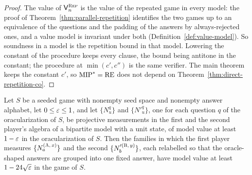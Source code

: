 \begin{proof}
\leanok
The value of $\mathsf{V}^{\textsc{Rep}}_n$ is the value of the repeated game in every model: the proof of
Theorem~\ref{thm:parallel-repetition} identifies the two games up to an equivalence of the
questions and the padding of the answers by always-rejected ones, and a value model is invariant
under both (Definition~\ref{def:value-model}). So soundness in a model is the repetition bound
in that model. Lowering the constant of the procedure keeps every clause, the bound being
antitone in the constant; the procedure at $\min(c', c'')$ is the same verifier. The main
theorem keeps the constant $c'$, so $\mathrm{MIP}^* = \mathrm{RE}$ does not depend on
Theorem~\ref{thm:direct-repetition-co}.
\end{proof}

\begin{lemma}
\label{lem:oracular-soundness-model}
\leanok
Let $S$ be a seeded game with nonempty seed space and nonempty answer alphabet, let
$0 \leq \varepsilon \leq 1$, and let $\{N^q_u\}$ and $\{N'^q_u\}$, one for each question $q$ of the
oracularization of $S$, be projective measurements in the first and the second player's algebra
of a bipartite model with a unit state, of model value at least $1 - \varepsilon$ in the
oracularization of $S$. Then the families in which the first player measures
$\{N^{(\textsc{A},\, x)}_a\}$ and the second $\{N'^{(\textsc{B},\, y)}_b\}$, each relabelled so that the
oracle-shaped answers are grouped into one fixed answer, have model value at least
$1 - 24\sqrt{\varepsilon}$ in the game of $S$.
\end{lemma}

